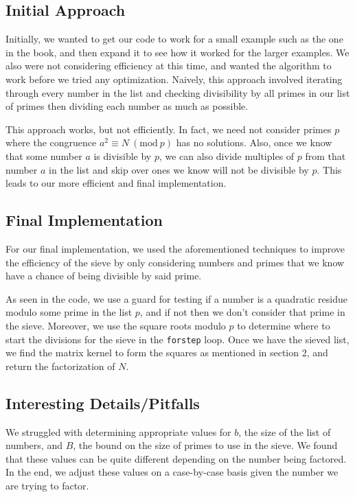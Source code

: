 \documentclass[titlepage]{article}
\newcommand{\Mod}[1]{\ (\text{mod}\ #1)}
\begin{document}
		\subsection{Initial Approach}
		Initially, we wanted to get our code to work for a small example such as the one in the book, and then expand it to see how it worked for the larger examples. We also were not considering efficiency at this time, and wanted the algorithm to work before we tried any optimization. Naively, this approach involved iterating through every number in the list and checking divisibility by all primes in our list of primes then dividing each number as much as possible.
		
		This approach works, but not efficiently. In fact, we need not consider primes $p$ where the congruence $a^2 \equiv N \Mod{p}$ has no solutions. Also, once we know that some number $a$ is divisible by $p$, we can also divide multiples of $p$ from that number $a$ in the list and skip over ones we know will not be divisible by $p$. This leads to our more efficient and final implementation.
	
		\subsection{Final Implementation}
		For our final implementation, we used the aforementioned techniques to improve the efficiency of the sieve by only considering numbers and primes that we know have a chance of being divisible by said prime.
		
		As seen in the code, we use a guard for testing if a number is a quadratic residue modulo some prime in the list $p$, and if not then we don't consider that prime in the sieve. Moreover, we use the square roots modulo $p$ to determine where to start the divisions for the sieve in the \verb|forstep| loop. Once we have the sieved list, we find the matrix kernel to form the squares as mentioned in section 2, and return the factorization of $N$.
	
		\subsection{Interesting Details/Pitfalls}
		We struggled with determining appropriate values for $b$, the size of the list of numbers, and $B$, the bound on the size of primes to use in the sieve. We found that these values can be quite different depending on the number being factored. In the end, we adjust these values on a case-by-case basis given the number we are trying to factor.
		
\end{document}
